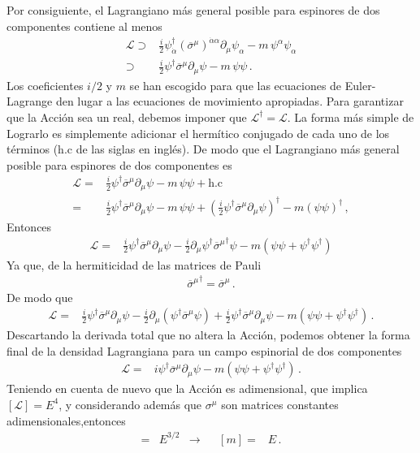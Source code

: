\begin{frame}
Por consiguiente, el Lagrangiano más general posible para espinores de dos componentes contiene al menos
\begin{align}
    \mathcal{L}\supset&\frac{i}{2}{\psi}^{\dagger}_{\dot{\alpha}}\left(\overline{\sigma}^{\mu}\right)^{\dot{\alpha}\alpha}\partial_\mu\psi_{\alpha}-m\,\psi^{\alpha}\psi_{\alpha} \nonumber\\
\supset&\frac{i}{2}{\psi}^{\dagger}\overline{\sigma}^\mu\partial_\mu\psi-m\,\psi\psi\,.
\end{align}
Los coeficientes $i/2$ y $m$ se han escogido para que las ecuaciones de Euler-Lagrange den lugar a las ecuaciones de movimiento apropiadas.
Para garantizar que la Acción sea un real, debemos imponer que  $\mathcal{L}^{\dagger}=\mathcal{L}$. La forma más simple de Lograrlo es simplemente adicionar el hermítico conjugado de cada uno de los términos (h.c de las siglas en inglés). De modo que el Lagrangiano más general posible para espinores de dos componentes es
\begin{align*}
  \mathcal{L}=&\frac{i}{2}{\psi}^{\dagger}\overline{\sigma}^\mu\partial_\mu\psi-m\,\psi\psi+
\text{h.c} \nonumber\\
=&\frac{i}{2}{\psi}^{\dagger}\overline{\sigma}^\mu\partial_\mu\psi-m\,\psi\psi+
\left(\frac{i}{2} {\psi}^{\dagger}\overline{\sigma}^\mu\partial_\mu\psi \right)^{\dagger}-m \left(\psi\psi  \right)^{\dagger}\,,
\end{align*}
Entonces
\begin{align*}
  \mathcal{L}=&\frac{i}{2}{\psi}^{\dagger}\overline{\sigma}^\mu\partial_\mu\psi-\frac{i}{2} \partial_\mu\psi^{\dagger}{\overline{\sigma}^\mu}^{\dagger}\psi-m \left( \psi\psi+\psi^{\dagger}\psi^{\dagger} \right)
\end{align*}
Ya que, de la hermiticidad de las matrices de Pauli
\begin{align}
{\overline{\sigma}^\mu}^{\dagger}=\overline{\sigma}^\mu\,.
\end{align}
De modo que
\begin{align}
\mathcal{L}=&\frac{i}{2}{\psi}^{\dagger}\overline{\sigma}^\mu\partial_\mu\psi-\frac{i}{2} \partial_\mu \left(  \psi^{\dagger} \overline{\sigma}^\mu\psi\right)
+\frac{i}{2}{\psi}^{\dagger}\overline{\sigma}^\mu\partial_\mu\psi
-m \left( \psi\psi+\psi^{\dagger}\psi^{\dagger} \right)\,.
\end{align}
Descartando la derivada total que no altera la Acción, podemos obtener la forma final de la densidad Lagrangiana para un campo espinorial de dos componentes
\begin{align}
  \mathcal{L}=&i{\psi}^{\dagger}\overline{\sigma}^\mu\partial_\mu\psi-
m \left( \psi\psi+\psi^{\dagger}\psi^{\dagger} \right)\,.
\end{align}
Teniendo en cuenta de nuevo que la Acción es adimensional, que implica $[\mathcal{L}]=E^4$, y considerando además que $\sigma^{\mu}$ son matrices constantes adimensionales,entonces
\begin{align*}
  [\psi]=&E^{3/2}&\to&& [m]=&E\,.
\end{align*}




\end{frame}
